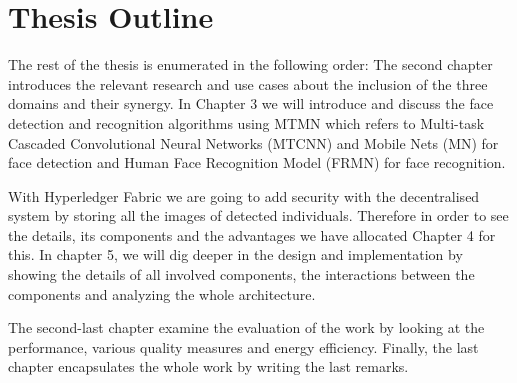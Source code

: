 \section{Thesis Outline}
The rest of the thesis is enumerated in the following order: The second chapter introduces the relevant research and use cases about the inclusion of the three domains and their synergy. In Chapter 3 we will introduce and discuss the face detection and recognition algorithms using MTMN which refers to Multi-task Cascaded Convolutional Neural Networks (MTCNN) and Mobile Nets (MN) for face detection and Human Face Recognition Model (FRMN) for face recognition. 

With Hyperledger Fabric we are going to add security with the decentralised system by storing all the images of detected individuals. Therefore in order to see the details, its components and the advantages we have allocated Chapter 4 for this. In chapter 5, we will dig deeper in the design and implementation by showing the details of all involved components, the interactions between the components and analyzing the whole architecture. 


The second-last chapter examine the evaluation of the work by looking at the performance, various quality measures and energy efficiency. Finally, the last chapter encapsulates the whole work by writing the last remarks.




